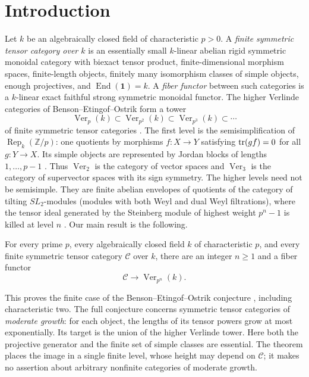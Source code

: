 \section{Introduction}
\label{sec:introduction}

Let $k$ be an algebraically closed field of characteristic $p>0$.
A \emph{finite symmetric tensor category over $k$} is an essentially small
$k$-linear abelian rigid symmetric monoidal category with biexact tensor
product, finite-dimensional morphism spaces, finite-length objects,
finitely many isomorphism classes of simple objects, enough projectives,
and $\operatorname{End}(\mathbf1)=k$.
A \emph{fiber functor} between such categories is a $k$-linear exact
faithful strong symmetric monoidal functor.
The higher Verlinde categories of Benson--Etingof--Ostrik form a tower
\[
 \operatorname{Ver}_{p}(k)\subset
 \operatorname{Ver}_{p^2}(k)\subset
 \operatorname{Ver}_{p^3}(k)\subset\cdots
\]
of finite symmetric tensor categories
\cite{BEO2023,Coulembier2021Envelopes}.
The first level is the semisimplification of
$\operatorname{Rep}_k(\mathbb Z/p)$: one quotients by morphisms
$f:X\to Y$ satisfying $\operatorname{tr}(gf)=0$ for all $g:Y\to X$.
Its simple objects are
represented by Jordan blocks of lengths $1,\ldots,p-1$
\cite[Section~2.3]{EtingofOstrikFrobenius}.
Thus $\operatorname{Ver}_2$ is the category of vector spaces and
$\operatorname{Ver}_3$ is the category of supervector spaces with its
sign symmetry. The higher levels need not be semisimple. They are finite
abelian envelopes of quotients of the category of tilting $SL_2$-modules
(modules with both Weyl and dual Weyl filtrations), where the tensor
ideal generated by the Steinberg module of highest weight $p^n-1$
is killed at level $n$ \cite[Sections~3.1 and~4.1, Theorem~4.2]{BEO2023}.
Our main result is the following.

\begin{theorem}\label{thm:main}
For every prime $p$, every algebraically closed field $k$ of
characteristic $p$, and every finite symmetric tensor category
$\mathcal C$ over $k$, there are an integer $n\geq1$ and a fiber functor
\[
 \mathcal C\longrightarrow\operatorname{Ver}_{p^n}(k).
\]
\end{theorem}

This proves the finite case of the Benson--Etingof--Ostrik conjecture
\cite[Conjecture~1.4]{BEO2023}, including characteristic two.
The full conjecture concerns symmetric tensor categories of
\emph{moderate growth}: for each object, the lengths of its tensor
powers grow at most exponentially. Its target is the union of the
higher Verlinde tower. Here both the projective generator and the
finite set of simple classes are essential. The theorem places the
image in a single finite level, whose height may depend on $\mathcal C$;
it makes no assertion about arbitrary nonfinite categories of moderate
growth.

